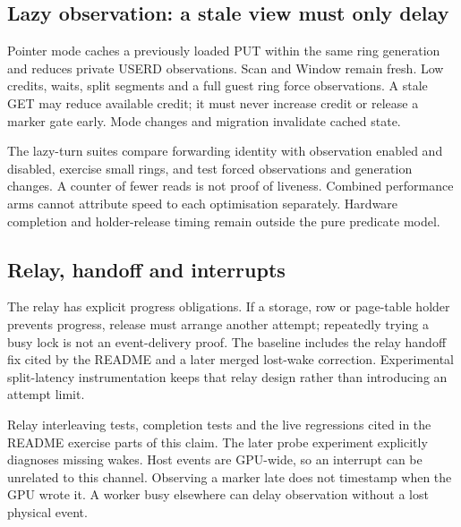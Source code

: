\subsection{Lazy observation: a stale view must only delay}

\readcode Pointer mode caches a previously loaded PUT within the same ring generation and
reduces private USERD observations. Scan and Window remain fresh. Low credits, waits, split
segments and a full guest ring force observations. A stale GET may reduce available credit;
it must never increase credit or release a marker gate early. Mode changes and migration
invalidate cached state.

{The lazy-turn suites compare forwarding identity with observation enabled and disabled,
exercise small rings, and test forced observations and generation changes.}
{A counter of fewer reads is not proof of liveness. Combined performance arms cannot attribute
speed to each optimisation separately. Hardware completion and holder-release timing remain
outside the pure predicate model.}

\subsection{Relay, handoff and interrupts}

\readcode The relay has explicit progress obligations. If a storage, row or page-table holder
prevents progress, release must arrange another attempt; repeatedly trying a busy lock is not
an event-delivery proof. The baseline includes the relay handoff fix cited by the README and
a later merged lost-wake correction. Experimental split-latency instrumentation keeps that
relay design rather than introducing an attempt limit.

{Relay interleaving tests, completion tests and the live regressions cited in the README
exercise parts of this claim. The later probe experiment explicitly diagnoses missing wakes.
}
{Host events are GPU-wide, so an interrupt can be unrelated to this channel. Observing a marker
late does not timestamp when the GPU wrote it. A worker busy elsewhere can delay observation
without a lost physical event.}

